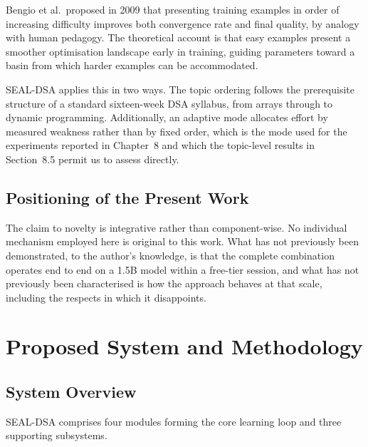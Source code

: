 \documentclass[12pt,a4paper]{report}
\begin{document}
Bengio et al.~proposed in 2009 that presenting training examples in order of increasing difficulty improves both convergence rate and final quality, by analogy with human pedagogy. The theoretical account is that easy examples present a smoother optimisation landscape early in training, guiding parameters toward a basin from which harder examples can be accommodated.

SEAL-DSA applies this in two ways. The topic ordering follows the prerequisite structure of a standard sixteen-week DSA syllabus, from arrays through to dynamic programming. Additionally, an adaptive mode allocates effort by measured weakness rather than by fixed order, which is the mode used for the experiments reported in Chapter~8 and which the topic-level results in Section~8.5 permit us to assess directly.

\section{Positioning of the Present Work}

The claim to novelty is integrative rather than component-wise. No individual mechanism employed here is original to this work. What has not previously been demonstrated, to the author's knowledge, is that the complete combination operates end to end on a 1.5B model within a free-tier session, and what has not previously been characterised is how the approach behaves at that scale, including the respects in which it disappoints.

\chapter{Proposed System and Methodology}

\section{System Overview}

SEAL-DSA comprises four modules forming the core learning loop and three supporting subsystems.
\end{document}
